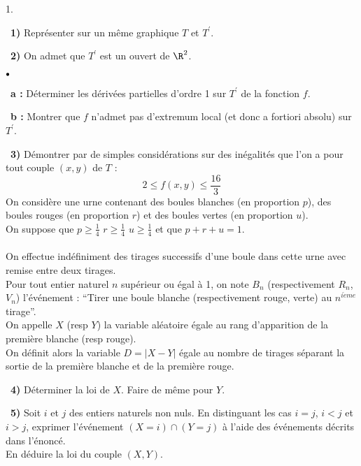 \documentclass[11pt]{article}%
\begin{document}
\begin{noliste}{1.}
 \setlength{\itemsep}{4mm}
\item[ \ \textbf{1)}] Représenter sur un même graphique $T$ et
$T^{\prime }$.

\item[ \ \textbf{2)}] On admet que $T^{\prime }$ est un ouvert de
$\R^{2}$.

\begin{noliste}{$\scriptstyle \bullet$}
\item[ \ \textbf{a :}] Déterminer les dérivées partielles d'ordre 1
sur $T^{\prime }$ de la fonction $f$.

\item[ \ \textbf{b :}] Montrer que $f$ n'admet pas d'extremum local (et
donc a
fortiori absolu) sur $T^{\prime }$.
\end{noliste}

\item[ \ \textbf{3)}] Démontrer par de simples considérations sur des
inégalités que l'on a pour tout couple $(x,y)$ de $T$ : 
\[
2\leq f(x,y)\leq {\frac{16}{3}} 
\]
On considère une urne contenant des boules blanches (en proportion
$p$),
des boules rouges (en proportion $r$) et des boules vertes (en
proportion $u$).\\
On suppose que \quad $p\geq  {\frac{1}{4}}$ \quad $r\geq 
{\frac{1}{4}}$ \quad $u\geq  {\frac{1}{4}}$ \quad
et que \quad $p + r + u = 1$.\\
\\
On effectue indéfiniment des tirages successifs d'une boule dans cette
urne avec remise entre deux tirages.\\
Pour tout entier naturel $n$ supérieur ou égal à 1, on note $B_{n}$
(respectivement $R_{n}$, $V_{n}$) l'événement : ``Tirer une
boule blanche (respectivement rouge, verte) au $n^{i\grave{e}me}$
tirage''. 
\\
On appelle $X$ (resp $Y$) la variable aléatoire égale au rang
d'apparition de la première blanche (resp rouge).\\
On définit alors la variable $D = |X-Y|$ égale au nombre de tirages
séparant la sortie de la première blanche et de la première rouge.

\item[ \ \textbf{4)}] Déterminer la loi de $X$. Faire de même pour $Y$.

\item[ \ \textbf{5)}] Soit $i$ et $j$ des entiers naturels non nuls. En
distinguant les cas $i = j$, $i<j$ et $i>j$, exprimer l'événement $(X =
i)\cap (Y = j)$ à l'aide des événements décrits dans l'énoncé.\\
En déduire la loi du couple $(X,Y)$.


\end{noliste}
\end{document}
